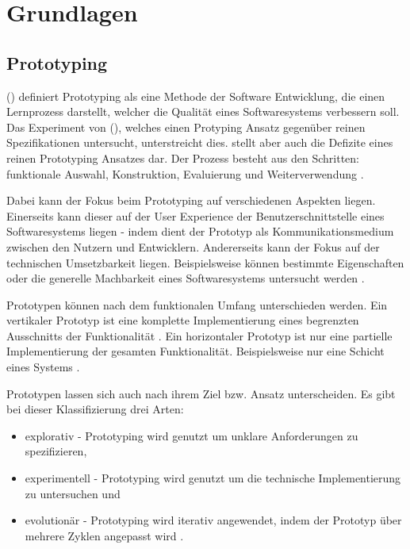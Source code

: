 \section{Grundlagen}
\label{sec:Grundlagen}

\subsection{Prototyping}
\citeauthor{Floyd.1984} (\citeyear[vgl.][S. 2f.]{Floyd.1984}) definiert Prototyping als eine Methode der Software Entwicklung, die einen Lernprozess darstellt, welcher die Qualität eines Softwaresystems verbessern soll.
Das Experiment von \citeauthor{Boehm.1984} (\citeyear[vgl.][S. 22]{Boehm.1984}), welches einen Protyping Ansatz gegenüber reinen Spezifikationen untersucht, unterstreicht dies.
\citeauthor{Boehm.1984} stellt aber auch die Defizite eines reinen Prototyping Ansatzes dar.
Der Prozess besteht aus den Schritten: funktionale Auswahl, Konstruktion, Evaluierung und Weiterverwendung \autocite[vgl.][S. 4]{Floyd.1984}.

Dabei kann der Fokus beim Prototyping auf verschiedenen Aspekten liegen.
Einerseits kann dieser auf der User Experience der Benutzerschnittstelle eines Softwaresystems liegen - indem dient der Prototyp als Kommunikationsmedium zwischen den Nutzern und Entwicklern.
Andererseits kann der Fokus auf der technischen Umsetzbarkeit liegen. Beispielsweise können bestimmte Eigenschaften oder die generelle Machbarkeit eines Softwaresystems untersucht werden \autocite[vgl.][S. 3]{Floyd.1984} \autocite[vgl.][S. 90ff.]{Budde.1990}.

Prototypen können nach dem funktionalen Umfang unterschieden werden.
Ein vertikaler Prototyp ist eine komplette Implementierung eines begrenzten Ausschnitts der Funktionalität \autocite[vgl.][S. 4]{Floyd.1984} \autocite[vgl.][S. 94]{Budde.1990}.
Ein horizontaler Prototyp ist nur eine partielle Implementierung der gesamten Funktionalität. Beispielsweise nur eine Schicht eines Systems \autocite[vgl.][S. 4]{Floyd.1984} \autocite[vgl.][S. 94]{Budde.1990}.

Prototypen lassen sich auch nach ihrem Ziel bzw. Ansatz unterscheiden.
Es gibt bei dieser Klassifizierung drei Arten:
\begin{itemize}
	\item explorativ - Prototyping wird genutzt um unklare Anforderungen zu spezifizieren,
	\item experimentell - Prototyping wird genutzt um die technische Implementierung zu untersuchen und
	\item evolutionär - Prototyping wird iterativ angewendet, indem der Prototyp über mehrere Zyklen angepasst wird  \autocite[vgl.][S. 6]{Floyd.1984} \autocite[vgl.][S. 93]{Budde.1990}.
\end{itemize}

